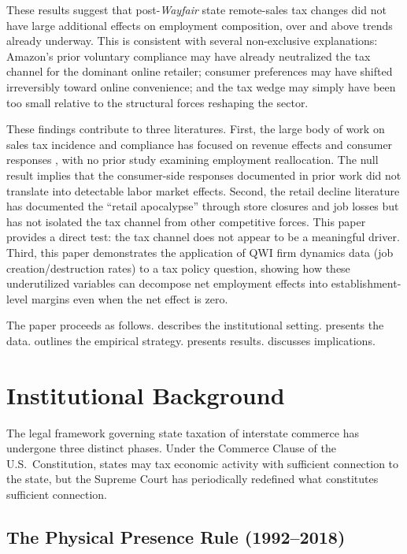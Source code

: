 \documentclass[12pt]{article}
\begin{document}
These results suggest that post-\textit{Wayfair} state remote-sales tax changes did not have large additional effects on employment composition, over and above trends already underway. This is consistent with several non-exclusive explanations: Amazon's prior voluntary compliance may have already neutralized the tax channel for the dominant online retailer; consumer preferences may have shifted irreversibly toward online convenience; and the tax wedge may simply have been too small relative to the structural forces reshaping the sector.

These findings contribute to three literatures. First, the large body of work on sales tax incidence and compliance has focused on revenue effects \citep{bruce2004,fox2009,baugh2018} and consumer responses \citep{anderson2010,einav2014,baugh2018}, with no prior study examining employment reallocation. The null result implies that the consumer-side responses documented in prior work did not translate into detectable labor market effects. Second, the retail decline literature has documented the ``retail apocalypse'' through store closures and job losses \citep{hortacsu2015,goldmanis2010} but has not isolated the tax channel from other competitive forces. This paper provides a direct test: the tax channel does not appear to be a meaningful driver. Third, this paper demonstrates the application of QWI firm dynamics data (job creation/destruction rates) to a tax policy question, showing how these underutilized variables can decompose net employment effects into establishment-level margins even when the net effect is zero.

The paper proceeds as follows.  describes the institutional setting.  presents the data.  outlines the empirical strategy.  presents results.  discusses implications.


\section{Institutional Background}
\label{sec:background}

The legal framework governing state taxation of interstate commerce has undergone three distinct phases. Under the Commerce Clause of the U.S.\ Constitution, states may tax economic activity with sufficient connection to the state, but the Supreme Court has periodically redefined what constitutes sufficient connection.

\subsection{The Physical Presence Rule (1992--2018)}
\end{document}
